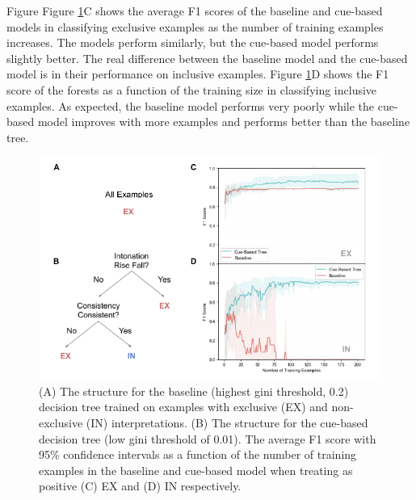 \documentclass[,man,floatsintext]{apa6}
\begin{document}
Figure Figure \ref{fig:binaryFigure}C shows the average F1 scores of the baseline and cue-based models in classifying exclusive examples as the number of training examples increases. The models perform similarly, but the cue-based model performs slightly better. The real difference between the baseline model and the cue-based model is in their performance on inclusive examples. Figure \ref{fig:binaryFigure}D shows the F1 score of the forests as a function of the training size in classifying inclusive examples. As expected, the baseline model performs very poorly while the cue-based model improves with more examples and performs better than the baseline tree.

\begin{figure}
\centering
\includegraphics{figs/binaryFigure-1.pdf}
\caption{\label{fig:binaryFigure}(A) The structure for the baseline (highest gini threshold, 0.2) decision tree trained on examples with exclusive (EX) and non-exclusive (IN) interpretations. (B) The structure for the cue-based decision tree (low gini threshold of 0.01). The average F1 score with 95\% confidence intervals as a function of the number of training examples in the baseline and cue-based model when treating as positive (C) EX and (D) IN respectively.}
\end{figure}
\end{document}
